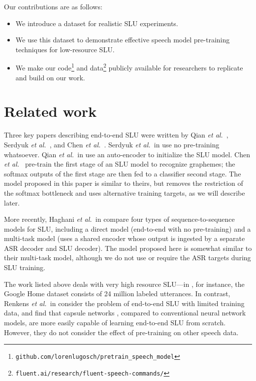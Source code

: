 \documentclass[a4paper]{article}
\newcommand{\etal}{\textit{et al.~}}
\begin{document}
Our contributions are as follows:
\begin{itemize}
    \item We introduce a dataset for realistic SLU experiments. 
    \item We use this dataset to demonstrate effective speech model pre-training techniques for low-resource SLU.
    \item We make our code\footnote{\texttt{github.com/lorenlugosch/pretrain\_speech\_model}} and data\footnote{\texttt{fluent.ai/research/fluent-speech-commands/}} publicly available for researchers to replicate and build on our work.
\end{itemize}

\section{Related work}

Three key papers describing end-to-end SLU were written by Qian \etal \cite{Qian2017}, Serdyuk \etal \cite{Serdyuk2018}, and Chen \etal \cite{Chen2018}. Serdyuk \etal in \cite{Serdyuk2018} use no pre-training whatsoever. Qian \etal in \cite{Qian2017} use an auto-encoder to initialize the SLU model. Chen \etal \cite{Chen2018} pre-train the first stage of an SLU model to recognize graphemes; the softmax outputs of the first stage are then fed to a classifier second stage. The model proposed in this paper is similar to theirs, but removes the restriction of the softmax bottleneck and uses alternative training targets, as we will describe later.

More recently, Haghani \etal in \cite{Haghani2018} compare four types of sequence-to-sequence models for SLU, including a direct model (end-to-end with no pre-training) and a multi-task model (uses a shared encoder whose output is ingested by a separate ASR decoder and SLU decoder). The model proposed here is somewhat similar to their multi-task model, although we do not use or require the ASR targets during SLU training.

The work listed above deals with very high resource SLU---in \cite{Haghani2018}, for instance, the Google Home \cite{li2017acoustic} dataset consists of 24 million labeled utterances.
In contrast, Renkens \etal in \cite{Renkens2018} consider the problem of end-to-end SLU with limited training data, and find that capsule networks \cite{sabour2017dynamic}, compared to conventional neural network models, are more easily capable of learning end-to-end SLU from scratch.
However, they do not consider the effect of pre-training on other speech data. 
\end{document}
